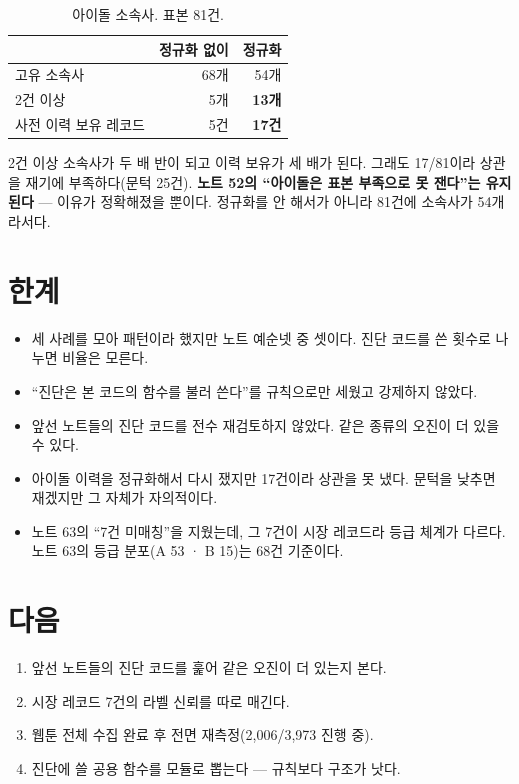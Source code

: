 \documentclass[10pt]{article}
\begin{document}
\begin{table}[t]
\centering\tsize
\caption{아이돌 소속사. 표본 81건.}
\begin{tabular}{lrr}
\toprule
& 정규화 없이 & 정규화 \\
\midrule
고유 소속사 & 68개 & 54개 \\
2건 이상 & 5개 & \textbf{13개} \\
사전 이력 보유 레코드 & 5건 & \textbf{17건} \\
\bottomrule
\end{tabular}
\end{table}

2건 이상 소속사가 두 배 반이 되고 이력 보유가 세 배가 된다. 그래도 17/81이라
상관을 재기에 부족하다(문턱 25건). \textbf{노트 52의 ``아이돌은 표본 부족으로
못 잰다''는 유지된다} --- 이유가 정확해졌을 뿐이다. 정규화를 안 해서가 아니라
81건에 소속사가 54개라서다.

\section{한계}

\begin{itemize}[leftmargin=1.1em,itemsep=0.15em]
\item 세 사례를 모아 패턴이라 했지만 노트 예순넷 중 셋이다. 진단 코드를 쓴
      횟수로 나누면 비율은 모른다.
\item ``진단은 본 코드의 함수를 불러 쓴다''를 규칙으로만 세웠고 강제하지 않았다.
\item 앞선 노트들의 진단 코드를 전수 재검토하지 않았다. 같은 종류의 오진이
      더 있을 수 있다.
\item 아이돌 이력을 정규화해서 다시 쟀지만 17건이라 상관을 못 냈다. 문턱을
      낮추면 재겠지만 그 자체가 자의적이다.
\item 노트 63의 ``7건 미매칭''을 지웠는데, 그 7건이 시장 레코드라 등급 체계가
      다르다. 노트 63의 등급 분포(A 53 · B 15)는 68건 기준이다.
\end{itemize}

\section{다음}

\begin{enumerate}[leftmargin=1.3em,itemsep=0.15em]
\item 앞선 노트들의 진단 코드를 훑어 같은 오진이 더 있는지 본다.
\item 시장 레코드 7건의 라벨 신뢰를 따로 매긴다.
\item 웹툰 전체 수집 완료 후 전면 재측정(2,006/3,973 진행 중).
\item 진단에 쓸 공용 함수를 모듈로 뽑는다 --- 규칙보다 구조가 낫다.
\end{enumerate}
\end{document}

